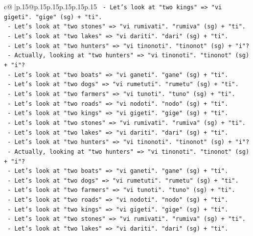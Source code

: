 \documentclass{article}
\begin{document}
{\begin{supertabular}{c@{$\;$}|p{.15\linewidth}@{}p{.15\linewidth}p{.15\linewidth}p{.15\linewidth}p{.15\linewidth}p{.15\linewidth}}
{{{\texttt{    {-} Let's look at "two kings" => "vi gigeti". "gige" (sg) + "ti".} \\
\texttt{    {-} Let's look at "two stones" => "vi rumivati". "rumiva" (sg) + "ti".} \\
\texttt{    {-} Let's look at "two lakes" => "vi dariti". "dari" (sg) + "ti".} \\
\texttt{    {-} Let's look at "two hunters" => "vi tinonoti". "tinonot" (sg) + "i"?} \\
\texttt{    {-} Actually, looking at "two hunters" => "vi tinonoti". "tinonot" (sg) + "i"?} \\
\texttt{    {-} Let's look at "two boats" => "vi ganeti". "gane" (sg) + "ti".} \\
\texttt{    {-} Let's look at "two dogs" => "vi rumetuti". "rumetu" (sg) + "ti".} \\
\texttt{    {-} Let's look at "two farmers" => "vi tunoti". "tuno" (sg) + "ti".} \\
\texttt{    {-} Let's look at "two roads" => "vi nodoti". "nodo" (sg) + "ti".} \\
\texttt{    {-} Let's look at "two kings" => "vi gigeti". "gige" (sg) + "ti".} \\
\texttt{    {-} Let's look at "two stones" => "vi rumivati". "rumiva" (sg) + "ti".} \\
\texttt{    {-} Let's look at "two lakes" => "vi dariti". "dari" (sg) + "ti".} \\
\texttt{    {-} Let's look at "two hunters" => "vi tinonoti". "tinonot" (sg) + "i"?} \\
\texttt{    {-} Actually, looking at "two hunters" => "vi tinonoti". "tinonot" (sg) + "i"?} \\
\texttt{    {-} Let's look at "two boats" => "vi ganeti". "gane" (sg) + "ti".} \\
\texttt{    {-} Let's look at "two dogs" => "vi rumetuti". "rumetu" (sg) + "ti".} \\
\texttt{    {-} Let's look at "two farmers" => "vi tunoti". "tuno" (sg) + "ti".} \\
\texttt{    {-} Let's look at "two roads" => "vi nodoti". "nodo" (sg) + "ti".} \\
\texttt{    {-} Let's look at "two kings" => "vi gigeti". "gige" (sg) + "ti".} \\
\texttt{    {-} Let's look at "two stones" => "vi rumivati". "rumiva" (sg) + "ti".} \\
\texttt{    {-} Let's look at "two lakes" => "vi dariti". "dari" (sg) + "ti".} \\
}}}
\end{supertabular}}
\end{document}
